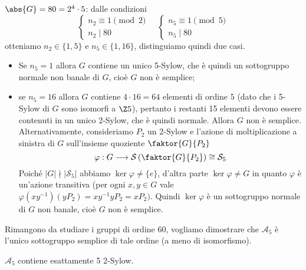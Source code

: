 \documentclass[11pt]{scrartcl}
\begin{document}
	\underline{$\abs{G} = 80 = 2^4\cdot 5$}: dalle condizioni
	\[
	\begin{cases}
		n_2 \equiv 1 \pmod 2\\
		n_2 \mid 80
	\end{cases}\quad
	\begin{cases}
		n_5 \equiv 1 \pmod 5\\
		n_5 \mid 80
	\end{cases}
	\]
	otteniamo $n_2 \in \{1, 5\}$ e $n_5 \in \{1, 16\}$, distinguiamo quindi due
	casi.
	\begin{itemize}
		\item Se $n_5 = 1$ allora $G$ contiene un unico 5-Sylow, che è quindi un
		sottogruppo normale non banale di $G$, cioè $G$ non è semplice;
		\item se $n_5 = 16$ allora $G$ contiene $4\cdot 16 = 64$ elementi di ordine
		$5$ (dato che i 5-Sylow di $G$ sono isomorfi a $\Z5$), pertanto i restanti
		15 elementi devono essere contenuti in un unico 2-Sylow, che è quindi normale.
		Allora $G$ non è semplice. \newline Alternativamente, consideriamo $P_2$ un 2-Sylow
		e l'azione di moltiplicazione a sinistra di $G$ sull'insieme quoziente $\faktor{G}{P_2}$
		\[
		\varphi: G\longrightarrow\mathcal{S}\left(\faktor{G}{P_2}\right) \cong \mathcal{S}_5
		\]
		Poiché $|G| \nmid |\mathcal{S}_5|$ abbiamo $\ker\varphi\neq\{e\}$, d'altra parte
		$\ker\varphi \neq G$ in quanto $\varphi$ è un'azione transitiva (per 
		ogni $x, y \in G$ vale $\varphi(xy^{-1})(yP_2) = xy^{-1}yP_2 = xP_2)$.
		Quindi $\ker\varphi$ è un sottogruppo normale di $G$ non banale, cioè $G$
		non è semplice. 
	\end{itemize}
	
	Rimangono da studiare i gruppi di ordine $60$, vogliamo dimostrare che 
	$\mathcal{A}_5$ è l'unico sottogruppo semplice di tale ordine (a meno di isomorfismo).
	
	\begin{lemma}
		$\mathcal{A}_5$ contiene esattamente 5 2-Sylow.
	\end{lemma}
	
\end{document}
